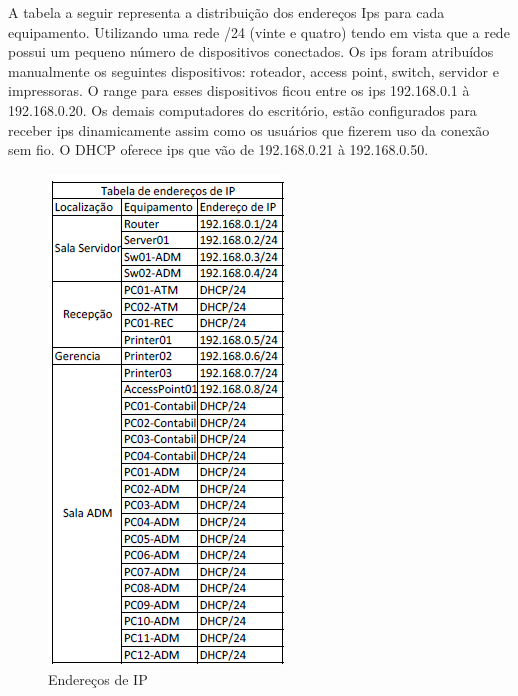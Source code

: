 \documentclass[	DIV=calc,%
							paper=a4,%
							fontsize=12pt,%
							onecolumn]{scrartcl}	 					%
\begin{document}
A tabela a seguir representa a distribuição dos endereços Ips para cada equipamento. Utilizando uma rede /24 (vinte e quatro) tendo em vista que a rede possui um pequeno número de dispositivos conectados. Os ips foram atribuídos manualmente os seguintes dispositivos:  roteador, access point, switch, servidor e impressoras.
O range para esses dispositivos ficou entre os ips 192.168.0.1 à 192.168.0.20. Os demais computadores do escritório, estão configurados para receber ips dinamicamente assim como os usuários que fizerem uso da conexão sem fio. O DHCP oferece ips que vão de 192.168.0.21 à 192.168.0.50.
  
    \begin{figure}[H]
	\centering
	\includegraphics[scale=1]{fig5}
	\caption{Endereços de IP}
	\label{fig5}
	\end{figure}
\end{document}
